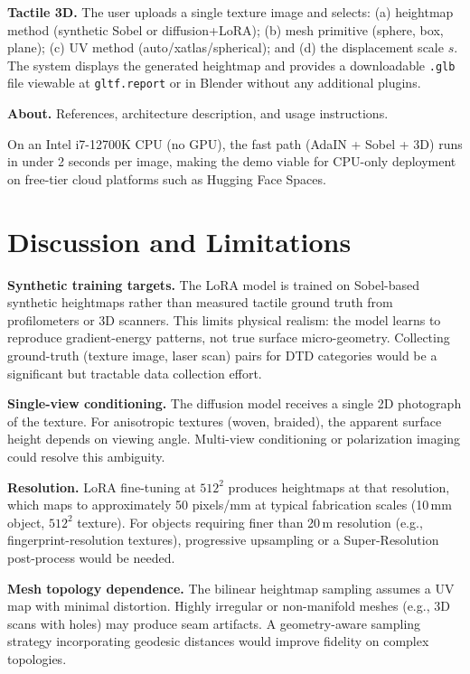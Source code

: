 \documentclass[conference]{IEEEtran}
\begin{document}
\textbf{Tactile 3D.} The user uploads a single texture image and selects:
(a) heightmap method (synthetic Sobel or diffusion+LoRA); (b) mesh primitive
(sphere, box, plane); (c) UV method (auto/xatlas/spherical); and (d) the
displacement scale $s$. The system displays the generated heightmap and
provides a downloadable \texttt{.glb} file viewable at
\texttt{gltf.report} or in Blender without any additional plugins.

\textbf{About.} References, architecture description, and usage instructions.

On an Intel i7-12700K CPU (no GPU), the fast path (AdaIN + Sobel + 3D) runs
in under 2 seconds per image, making the demo viable for CPU-only deployment
on free-tier cloud platforms such as Hugging Face Spaces.

\section{Discussion and Limitations}

\textbf{Synthetic training targets.} The LoRA model is trained on Sobel-based
synthetic heightmaps rather than measured tactile ground truth from profilometers
or 3D scanners. This limits physical realism: the model learns to reproduce
gradient-energy patterns, not true surface micro-geometry. Collecting
ground-truth (texture image, laser scan) pairs for DTD categories would be a
significant but tractable data collection effort.

\textbf{Single-view conditioning.} The diffusion model receives a single 2D
photograph of the texture. For anisotropic textures (woven, braided), the
apparent surface height depends on viewing angle. Multi-view conditioning or
polarization imaging \cite{b22} could resolve this ambiguity.

\textbf{Resolution.} LoRA fine-tuning at $512^2$ produces heightmaps at that
resolution, which maps to approximately 50 pixels/mm at typical fabrication
scales (10\,mm object, $512^2$ texture). For objects requiring finer than
20\,\textmu m resolution (e.g., fingerprint-resolution textures), progressive
upsampling or a Super-Resolution post-process \cite{b5} would be needed.

\textbf{Mesh topology dependence.} The bilinear heightmap sampling assumes
a UV map with minimal distortion. Highly irregular or non-manifold meshes
(e.g., 3D scans with holes) may produce seam artifacts. A geometry-aware
sampling strategy incorporating geodesic distances would improve fidelity on
complex topologies.
\end{document}
